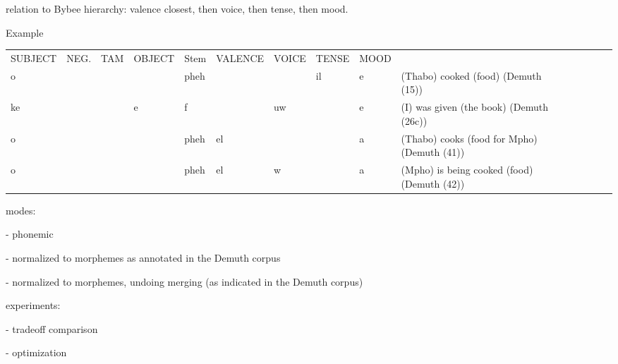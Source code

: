 \documentclass[11pt,letterpaper]{article}
\begin{document}
relation to Bybee hierarchy: valence closest, then voice, then tense, then mood.

Example

\begin{tabular}{lllllllll|lllllll}
SUBJECT & NEG. & TAM & OBJECT & Stem & VALENCE & VOICE & TENSE & MOOD \\
o       &          &     &        & pheh &         &       & il    & e  & (Thabo) cooked (food) (Demuth (15)) \\
ke      &          &     & e      & f   &          & uw    &      & e   & (I) was given (the book) (Demuth (26c)) \\
o       &          &     &        & pheh & el      &      &       & a & (Thabo) cooks (food for Mpho) (Demuth (41))\\
o       &          &     &        & pheh & el      & w    &      & a & (Mpho) is being cooked (food) (Demuth (42))
\end{tabular}



modes:

- phonemic

- normalized to morphemes as annotated in the Demuth corpus

- normalized to morphemes, undoing merging (as indicated in the Demuth corpus)

experiments:

- tradeoff comparison

- optimization


\end{document}
